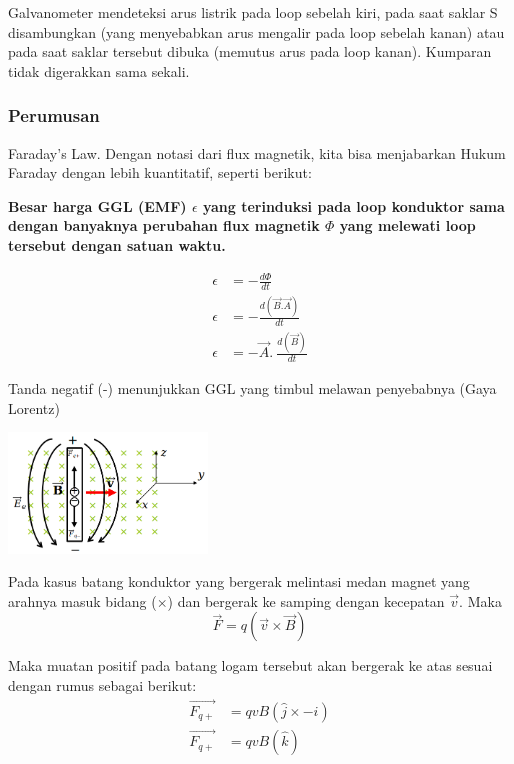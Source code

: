 \documentclass[twocolumn, 11pt]{article}%
\begin{document}
Galvanometer mendeteksi arus listrik pada loop sebelah kiri, pada saat
saklar S disambungkan (yang menyebabkan arus mengalir pada loop sebelah
kanan) atau pada saat saklar tersebut dibuka (memutus arus pada loop
kanan). Kumparan tidak digerakkan sama sekali.

\subsubsection{Perumusan}%
Faraday’s Law. Dengan notasi dari flux magnetik, kita bisa menjabarkan
Hukum Faraday dengan lebih kuantitatif, seperti berikut:

\begin{center}
    \textbf{
        Besar harga GGL (EMF) $\epsilon$ yang terinduksi pada loop
        konduktor sama dengan banyaknya perubahan flux magnetik $\Phi$ yang melewati loop tersebut dengan satuan waktu.
    }
\end{center}

\begin{align*}
    \epsilon &= -\frac{d\Phi}{dt}\\
    \epsilon &= -\frac{d(\vec B. \vec A)}{dt}\\
    \epsilon &= -\vec A.\ \frac{d(\vec B)}{dt}
\end{align*}

Tanda negatif (-) menunjukkan GGL yang timbul melawan penyebabnya (Gaya
Lorentz)

\begin{center}
    \includegraphics[width=200px]{3.png}
\end{center}
Pada kasus batang konduktor yang bergerak melintasi medan magnet yang
arahnya masuk bidang ($\times$) dan bergerak ke samping dengan kecepatan
$\vec v$. Maka
\[\vec F=q(\vec v \times \vec B) \]

Maka muatan positif pada batang logam tersebut akan bergerak ke atas
sesuai dengan rumus sebagai berikut:
\begin{align*}
    \overrightarrow{F_{q+}} &= qvB(\hat j \times -\hat i)\\
    \overrightarrow{F_{q+}} &= qvB(\hat k)
\end{align*}
\end{document}
